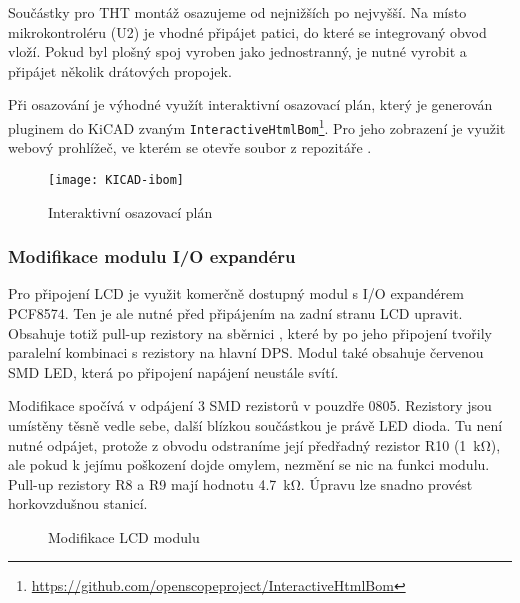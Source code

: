 Součástky pro THT montáž osazujeme od nejnižších po nejvyšší. Na místo
mikrokontroléru (U2) je vhodné připájet patici, do které se integrovaný obvod
vloží. Pokud byl plošný spoj vyroben jako jednostranný, je nutné vyrobit
a připájet několik drátových propojek.

Při osazování je výhodné využít interaktivní osazovací plán, který je generován
pluginem do KiCAD zvaným
\texttt{InteractiveHtmlBom}\footnote{\url{https://github.com/openscopeproject/InteractiveHtmlBom}}.
Pro jeho zobrazení je využit webový prohlížeč, ve kterém se otevře soubor
 z repozitáře .

\begin{figure}[htbp]
    \centering
    \texttt{[image: KICAD-ibom]}
    \caption{Interaktivní osazovací plán}
    \label{fig:PCB ibom}
\end{figure}


\subsubsection{Modifikace modulu I/O expandéru}
Pro připojení LCD je využit komerčně dostupný modul s I/O expandérem PCF8574.
Ten je ale nutné před připájením na zadní stranu LCD upravit. Obsahuje totiž
pull-up rezistory na sběrnici \IIC{}, které by po jeho připojení tvořily
paralelní kombinaci s rezistory na hlavní DPS. Modul také obsahuje červenou SMD
LED, která po připojení napájení neustále svítí.

Modifikace spočívá v odpájení 3 SMD rezistorů v pouzdře 0805. Rezistory jsou
umístěny těsně vedle sebe, další blízkou součástkou je právě LED dioda. Tu není
nutné odpájet, protože z obvodu odstraníme její předřadný rezistor R10
(\SI{1}{\kilo\ohm}), ale pokud k jejímu poškození dojde omylem, nezmění se nic
na funkci modulu. Pull-up rezistory R8 a R9 mají hodnotu \SI{4,7}{\kilo\ohm}.
Úpravu lze snadno provést horkovzdušnou stanicí.

\begin{figure}[htbp]
    \centering
    \caption{Modifikace LCD modulu}
    \label{fig:PCB LCD modul modifikace}
\end{figure}


